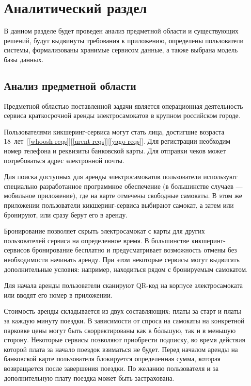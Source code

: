 \chapter{Аналитический раздел}

В данном разделе будет проведен анализ предметной области и существующих решений, будут выдвинуты требования к приложению, определены пользователи системы, формализованы хранимые сервисом данные, а также выбрана модель базы данных.

\section{Анализ предметной области}

Предметной областью поставленной задачи является операционная деятельность сервиса краткосрочной аренды электросамокатов в крупном российском городе.

Пользователями кикшеринг-сервиса могут стать лица, достигшие возраста 18~лет~[\ref{whoosh-reqs}][\ref{urent-reqs}][\ref{yago-reqs}]. Для регистрации необходим номер телефона и реквизиты банковской карты. Для отправки чеков может потребоваться адрес электронной почты.

Для поиска доступных для аренды электросамокатов пользователи используют специально разработанное программное обеспечение (в большинстве случаев --- мобильное приложение), где на карте отмечены свободные самокаты. В этом же приложении пользователи кикшеринг-сервиса выбирают самокат, а затем или бронируют, или сразу берут его в аренду.

Бронирование позволяет скрыть электросамокат с карты для других пользователей сервиса на определенное время. В большинстве кикшеринг-сервисов бронирование бесплатно и предусматривает возможность отмены без необходимости начинать аренду. При этом некоторые сервисы могут выдвигать дополнительные условия: например, находиться рядом с бронируемым самокатом.

Для начала аренды пользователи сканируют QR-код на корпусе электросамоката или вводят его номер в приложении.

Стоимость аренды складывается из двух составляющих: платы за старт и платы за каждую минуту поездки. В зависимости от спроса на самокаты на конкретной парковке цены могут быть скорректированы как в б\'{о}льшую, так и в меньшую сторону. Некоторые сервисы позволяют приобрести подписку, во время действия которой плата за начало поездок взиматься не будет. Перед началом аренды на банковской карте пользователя блокируется определенная сумма, которая возвращается после завершения поездки. По желанию пользователя и за дополнительную плату поездка может быть застрахована.

